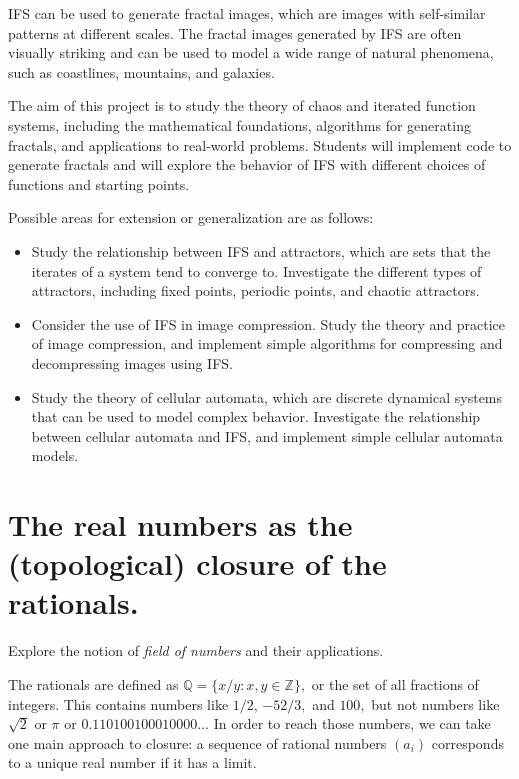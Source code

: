 \documentclass{article}
\begin{document}
    \vspace{3mm}
    IFS can be used to generate fractal images, which are images with self-similar patterns at different scales. The fractal images generated by IFS are often visually striking and can be used to model a wide range of natural phenomena, such as coastlines, mountains, and galaxies.
    
    \vspace{3mm}
    The aim of this project is to study the theory of chaos and iterated function systems, including the mathematical foundations, algorithms for generating fractals, and applications to real-world problems. Students will implement code to generate fractals and will explore the behavior of IFS with different choices of functions and starting points.
    
    \vspace{3mm}
    Possible areas for extension or generalization are as follows:
    \begin{itemize}
        \item Study the relationship between IFS and attractors, which are sets that the iterates of a system tend to converge to. Investigate the different types of attractors, including fixed points, periodic points, and chaotic attractors.
        \item Consider the use of IFS in image compression. Study the theory and practice of image compression, and implement simple algorithms for compressing and decompressing images using IFS.
        \item Study the theory of cellular automata, which are discrete dynamical systems that can be used to model complex behavior. Investigate the relationship between cellular automata and IFS, and implement simple cellular automata models.
    \end{itemize}


\pagebreak

\section{The real numbers as the (topological) closure of the rationals.}

    Explore the notion of {\it field of numbers} and their applications.

    The rationals are defined as $\mathbb{Q} = \{x/y : x,y\in\mathbb{Z}\},$ or the set of all fractions of integers.
    This contains numbers like $1/2$, $-52/3,$ and $100,$ but not numbers like $\sqrt 2$ or $\pi$ or $0.110100100010000\ldots$
    In order to reach those numbers, we can take one main approach to closure: a sequence of rational numbers $(a_i)$ corresponds to a unique real number if it has a limit.
\end{document}
